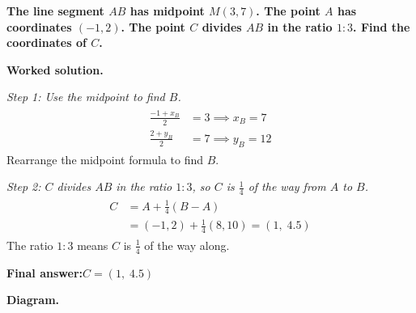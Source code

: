 \documentclass[11pt]{article}
\newcommand{\question}[1]{\par\medskip\noindent\textbf{#1}\par}
\begin{document}
\question{The line segment \( AB \) has midpoint \( M(3, 7) \). The point \( A \) has coordinates \( (-1, 2) \). The point \( C \) divides \( AB \) in the ratio \( 1:3 \). Find the coordinates of \( C \).}

\textbf{Worked solution.}

\textit{Step 1: Use the midpoint to find \(B\).}
\[\begin{gathered}
\begin{aligned} \frac{-1 + x_B}{2} &= 3 \implies x_B = 7 \\ \frac{2 + y_B}{2} &= 7 \implies y_B = 12 \end{aligned}
\end{gathered}\]
Rearrange the midpoint formula to find \(B\).

\textit{Step 2: \(C\) divides \(AB\) in the ratio \(1:3\), so \(C\) is \(\frac{1}{4}\) of the way from \(A\) to \(B\).}
\[\begin{gathered}
\begin{aligned} C &= A + \frac{1}{4}(B - A) \\ &= (-1, 2) + \frac{1}{4}(8, 10) = (1,\; 4.5) \end{aligned}
\end{gathered}\]
The ratio \(1:3\) means \(C\) is \(\frac{1}{4}\) of the way along.

\begin{answerbox}
\textbf{Final answer:}\quad \(\displaystyle C = (1,\; 4.5)\)
\end{answerbox}
\textbf{Diagram.}
\end{document}
